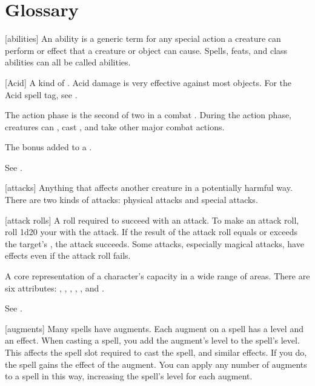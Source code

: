 \chapter{Glossary}\label{Glossary}

[abilities] An ability is a generic term for any special action a creature can perform or effect that a creature or object can cause. Spells, feats, and class abilities can all be called abilities.

[Acid] A kind of . Acid damage is very effective against most objects. For the Acid spell tag, see .

 The action phase is the second of two  in a combat .
During the action phase, creatures can , cast , and take other major combat actions.

 The bonus added to a .

 See .

[attacks] Anything that affects another creature in a potentially harmful way. There are two kinds of attacks: physical attacks and special attacks.

[attack rolls] A roll required to succeed with an attack.
To make an attack roll, roll 1d20 \add your  with the attack.
If the result of the attack roll equals or exceeds the target's , the attack succeeds.
Some attacks, especially magical attacks, have effects even if the attack roll fails.

 A core representation of a character's capacity in a wide range of areas. There are six attributes: , , , , , and .

 See .

[augments] Many spells have augments.
Each augment on a spell has a level and an effect.
When casting a spell, you add the augment's level to the spell's level.
This affects the spell slot required to cast the spell, and similar effects.
If you do, the spell gains the effect of the augment.
You can apply any number of augments to a spell in this way, increasing the spell's level for each augment.

